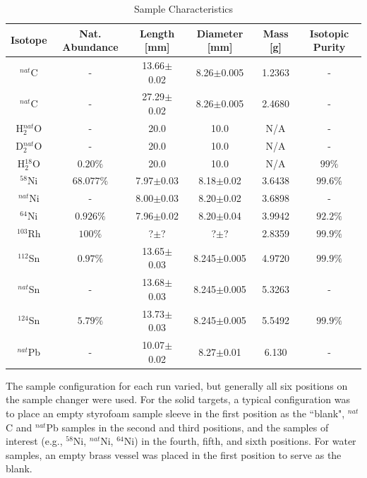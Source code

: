 \documentclass[twocolumn,secnumarabic,amssymb, nobibnotes, aps, prl,
superscriptaddress, nobalancelastpage]{revtex4}
\begin{document}
\begin{table}[t]
    \caption{Sample Characteristics}
    \label{SampleTable}
    \begin{center}
        \begin{tabular}{ c c c c c c }
            \hline
            Isotope & Nat. Abundance & Length [mm] & Diameter
            [mm] & Mass [g] & Isotopic Purity\\
            \hline

            $^{nat}$C & - & 13.66$\pm$0.02 & 8.26$\pm$0.005 & 1.2363 & -\\
            $^{nat}$C & - & 27.29$\pm$0.02 & 8.26$\pm$0.005 & 2.4680 & -\\

            H$_{2}^{nat}$O & - & 20.0 & 10.0 & N/A & - \\
            D$_{2}^{nat}$O & - & 20.0 & 10.0 & N/A & - \\
            H$_{2}^{18}$O & $0.20\%$ & 20.0 & 10.0 & N/A & $99\%$\\

            $^{58}$Ni & $68.077\%$ & 7.97$\pm$0.03 & 8.18$\pm$0.02 & 3.6438 & $99.6\%$\\
            $^{nat}$Ni & - & 8.00$\pm$0.03 & 8.20$\pm$0.02 & 3.6898 & -\\
            $^{64}$Ni & $0.926\%$ & 7.96$\pm$0.02 & 8.20$\pm$0.04 & 3.9942 & $92.2\%$\\

            $^{103}$Rh & $100\%$ & ?$\pm$? & ?$\pm$? & 2.8359 & $99.9\%$\\

            $^{112}$Sn & $0.97\%$ & 13.65$\pm$0.03 & 8.245$\pm$0.005 & 4.9720 & $99.9\%$\\
            $^{nat}$Sn & - & 13.68$\pm$0.03 & 8.245$\pm$0.005 & 5.3263 & -\\
            $^{124}$Sn & $5.79\%$ & 13.73$\pm$0.03 & 8.245$\pm$0.005 & 5.5492 &
            $99.9\%$\\

            $^{nat}$Pb & - & 10.07$\pm$0.02 & 8.27$\pm$0.01 & 6.130 & -\\

            \hline
        \end{tabular}
    \end{center}
\end{table}

The sample configuration for each run varied, but generally all six positions
on the sample changer were used. For the solid targets, a typical configuration 
was to place an empty styrofoam sample sleeve in the first position as the ``blank", 
$^{nat}$C and $^{nat}$Pb samples in the second and third positions, and the samples of 
interest (e.g., $^{58}$Ni, $^{nat}$Ni, $^{64}$Ni) in the fourth, fifth, and sixth
positions. For water samples, an empty brass vessel was placed in the first
position to serve as the blank.
\end{document}
